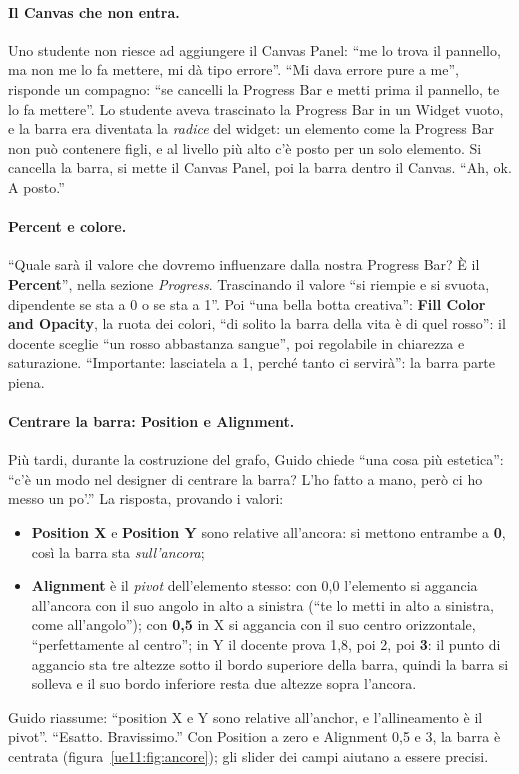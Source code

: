 \paragraph{Il Canvas che non entra.} Uno studente non riesce ad aggiungere il Canvas
Panel: ``me lo trova il pannello, ma non me lo fa mettere, mi dà tipo errore''. ``Mi dava
errore pure a me'', risponde un compagno: ``se cancelli la Progress Bar e metti prima il
pannello, te lo fa mettere''. Lo studente aveva trascinato la Progress Bar in un Widget
vuoto, e la barra era diventata la \emph{radice} del widget: un elemento come la Progress
Bar non può contenere figli, e al livello più alto c'è posto per un solo elemento. Si
cancella la barra, si mette il Canvas Panel, poi la barra dentro il Canvas. ``Ah, ok. A
posto.''

\paragraph{Percent e colore.} ``Quale sarà il valore che dovremo influenzare dalla nostra
Progress Bar? È il \textbf{Percent}'', nella sezione \emph{Progress}. Trascinando il valore
``si riempie e si svuota, dipendente se sta a 0 o se sta a 1''. Poi ``una bella botta
creativa'': \textbf{Fill Color and Opacity}, la ruota dei colori, ``di solito la barra
della vita è di quel rosso'': il docente sceglie ``un rosso abbastanza sangue'', poi
regolabile in chiarezza e saturazione. ``Importante: lasciatela a 1, perché tanto ci
servirà'': la barra parte piena.

\paragraph{Centrare la barra: Position e Alignment.} Più tardi, durante la costruzione del
grafo, Guido chiede ``una cosa più estetica'': ``c'è un modo nel designer di centrare la
barra? L'ho fatto a mano, però ci ho messo un po'.'' La risposta, provando i valori:
\begin{itemize}
  \item \textbf{Position X} e \textbf{Position Y} sono relative all'ancora: si mettono
        entrambe a \textbf{0}, così la barra sta \emph{sull'ancora};
  \item \textbf{Alignment} è il \emph{pivot} dell'elemento stesso: con 0,0 l'elemento si
        aggancia all'ancora con il suo angolo in alto a sinistra (``te lo metti in alto a
        sinistra, come all'angolo''); con \textbf{0,5} in X si aggancia con il suo centro
        orizzontale, ``perfettamente al centro''; in Y il docente prova 1,8, poi 2, poi
        \textbf{3}: il punto di aggancio sta tre altezze sotto il bordo superiore della barra,
        quindi la barra si solleva e il suo bordo inferiore resta due altezze sopra
        l'ancora.
\end{itemize}
Guido riassume: ``position X e Y sono relative all'anchor, e l'allineamento è il pivot''.
``Esatto. Bravissimo.'' Con Position a zero e Alignment 0,5 e 3, la barra è centrata
(figura~\ref{ue11:fig:ancore}); gli slider dei campi aiutano a essere precisi.

